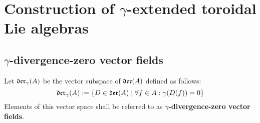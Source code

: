 \section{Construction of \texorpdfstring{$\gamma$}{}-extended toroidal Lie algebras}
    \subsection{\texorpdfstring{$\gamma$}{}-divergence-zero vector fields} \label{subsection: yangian_div_zero_vector_fields}
        \begin{definition} \label{def: yangian_div_zero_vector_fields}
            Let $\mathfrak{der}_{\gamma}(A)$ be the vector subspace of $\mathfrak{der}(A)$ defined as follows:
                $$\mathfrak{der}_{\gamma}(A) := \{ D \in \mathfrak{der}(A) \mid \forall f \in A: \gamma(D(f)) = 0 \}$$
            Elements of this vector space shall be referred to as \textbf{$\gamma$-divergence-zero vector fields}.
        \end{definition}

